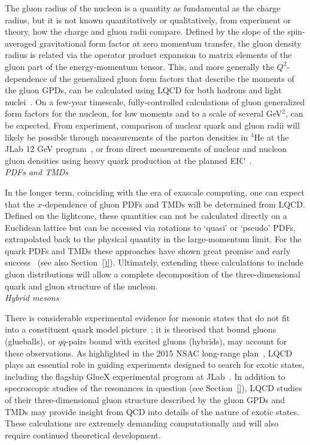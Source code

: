 The gluon radius of the nucleon is a quantity as fundamental as the charge radius, but it is not known quantitatively or qualitatively, from experiment or theory, how the charge and gluon radii compare. 
Defined by the slope of the spin-averaged gravitational form factor at zero momentum transfer, the gluon density radius is related via the operator product expansion to matrix elements of the gluon part of the energy-momentum tensor.
This, and more generally the $Q^2$-dependence of the generalized gluon form factors that describe the moments of the gluon GPDs, can be calculated using LQCD for both hadrons and light nuclei~\cite{Detmold:2017oqb,Winter:2017bfs}.
On a few-year timescale, fully-controlled calculations of gluon generalized form factors for the nucleon, for low moments and to a scale of several GeV$^2$, can be expected.
From experiment, comparison of nuclear quark and gluon radii will likely be possible through measurements of the parton densities in ${}^4$He at the JLab 12 GeV program~\cite{Hattawy:2017woc}, or from direct measurements of nuclear and nucleon gluon densities using heavy quark production at the planned EIC~\cite{Chudakov:2016otl}. \\


{\it PDFs and TMDs}

In the longer term, coinciding with the era of exascale computing, one can expect that the $x$-dependence of gluon PDFs and TMDs will be determined from LQCD. Defined on the lightcone, these quantities can not be calculated directly on a Euclidean lattice but can be accessed via rotations to `quasi' or `pseudo' PDFs, extrapolated back to the physical quantity in the large-momentum limit. For the quark PDFs and TMDs these approaches have shown great promise and early success~\cite{Lin:2014zya,Alexandrou:2015rja} ({see also \color{red} Section~\ref{)}}). Ultimately, extending these calculations to include gluon distributions will allow a complete decomposition of the three-dimensional quark and gluon structure of the nucleon.\\

{\it Hybrid mesons}

There is considerable experimental evidence for mesonic states that do not fit into a constituent quark model picture~\cite{Patrignani:2016xqp}; it is theorised that bound gluons (glueballs), or $q\overline{q}$-pairs bound with excited gluons (hybrids), may account for these observations. 
As highlighted in the 2015 NSAC long-range plan~\cite{Geesaman:2015fha}, LQCD plays an essential role in guiding experiments designed to search for exotic states, including the flagship GlueX experimental program at JLab~\cite{Dobbs:2017vjw}. In addition to specroscopic studies of the resonances in question {\color{red}(see Section~\ref{})}, LQCD studies of their three-dimensional gluon structure described by the gluon GPDs and TMDs may provide insight from QCD into details of the nature of exotic states. These calculations are extremely demanding computationally and will also require continued theoretical development.

